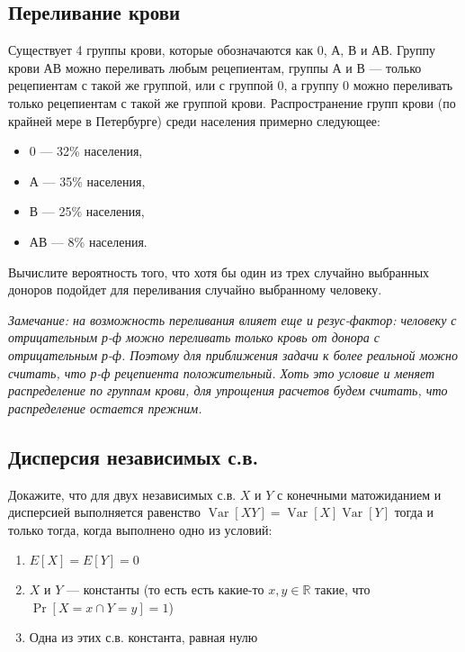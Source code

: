 \documentclass[12pt]{article}
\newcommand\R{\mathbb{R}}
\DeclareMathOperator{\Var}{Var}
\begin{document}
\subsection{Переливание крови}
Существует 4 группы крови, которые обозначаются как 0, А, В и АВ. Группу крови АВ можно переливать любым рецепиентам, группы А и В --- только рецепиентам с такой же группой, или с группой 0, а группу 0 можно переливать только рецепиентам с такой же группой крови. Распространение групп крови (по крайней мере в Петербурге) среди населения примерно следующее:
\begin{itemize}
    \item 0 --- 32\% населения,
    \item А --- 35\% населения,
    \item В --- 25\% населения,
    \item АВ --- 8\% населения.
\end{itemize}
Вычислите вероятность того, что хотя бы один из трех случайно выбранных доноров подойдет для переливания случайно выбранному человеку. 

\emph{Замечание: на возможность переливания влияет еще и резус-фактор: человеку с отрицательным р-ф можно переливать только кровь от донора с отрицательным р-ф. Поэтому для приближения задачи к более реальной можно считать, что р-ф рецепиента положительный. Хоть это условие и меняет распределение по группам крови, для упрощения расчетов будем считать, что распределение остается прежним.}

\subsection{Дисперсия независимых с.в.}
Докажите, что для двух независимых с.в. $X$ и $Y$ с конечными матожиданием и дисперсией выполняется равенство $\Var[XY] = \Var[X]\Var[Y]$ тогда и только тогда, когда выполнено одно из условий:
\begin{enumerate}
    \item $E[X] = E[Y] = 0$
    \item $X$ и $Y$ --- константы (то есть есть какие-то $x, y \in \R$ такие, что $\Pr[X = x \cap Y = y] = 1$)
    \item Одна из этих с.в. константа, равная нулю
\end{enumerate}
\end{document}
